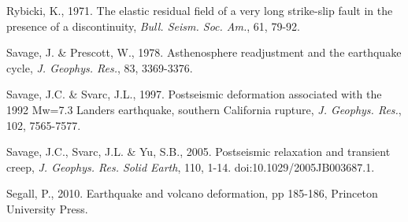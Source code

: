 \documentclass[extra,mreferee]{gji}
\begin{document}
\begin{thebibliography}{}
 Rybicki, K., 1971. The elastic
  residual field of a very long strike-slip fault in the presence of a
  discontinuity, \textit{Bull. Seism. Soc. Am.}, 61, 79-92.

 Savage, J. \&
  Prescott, W., 1978. Asthenosphere readjustment and the earthquake
  cycle, \textit{J. Geophys. Res.}, 83, 3369-3376.

 Savage, J.C. \& Svarc, J.L.,
  1997. Postseismic deformation associated with the 1992 Mw=7.3
  Landers earthquake, southern California rupture,
  \textit{J. Geophys. Res.}, 102, 7565-7577.

 Savage, J.C., Svarc, J.L. \& Yu,
  S.B., 2005. Postseismic relaxation and transient creep,
  \textit{J. Geophys. Res. Solid Earth}, 110,
  1-14. doi:10.1029/2005JB003687.1.

 Segall, P., 2010. Earthquake and
  volcano deformation, pp 185-186, Princeton University Press.

\end{thebibliography}
\end{document}
